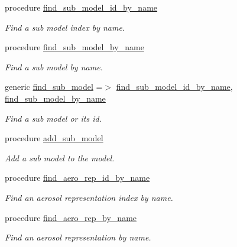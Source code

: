 \begin{DoxyCompactItemize}
procedure \mbox{\hyperlink{structpmc__phlex__core_1_1phlex__core__t_ae678b242f384c24e22677ac1265a2035}{find\+\_\+sub\+\_\+model\+\_\+id\+\_\+by\+\_\+name}}
\begin{DoxyCompactList}\small\item\em Find a sub model index by name. \end{DoxyCompactList}\item 
procedure \mbox{\hyperlink{structpmc__phlex__core_1_1phlex__core__t_aa741538e73789f6d392cc23c0e5e4ca3}{find\+\_\+sub\+\_\+model\+\_\+by\+\_\+name}}
\begin{DoxyCompactList}\small\item\em Find a sub model by name. \end{DoxyCompactList}\item 
generic \mbox{\hyperlink{structpmc__phlex__core_1_1phlex__core__t_aee9a9252bd18b2b2e0ce4f65ed8f7ec6}{find\+\_\+sub\+\_\+model}} =$>$ \mbox{\hyperlink{structpmc__phlex__core_1_1phlex__core__t_ae678b242f384c24e22677ac1265a2035}{find\+\_\+sub\+\_\+model\+\_\+id\+\_\+by\+\_\+name}}, \mbox{\hyperlink{structpmc__phlex__core_1_1phlex__core__t_aa741538e73789f6d392cc23c0e5e4ca3}{find\+\_\+sub\+\_\+model\+\_\+by\+\_\+name}}
\begin{DoxyCompactList}\small\item\em Find a sub model or it\textquotesingle{}s id. \end{DoxyCompactList}\item 
procedure \mbox{\hyperlink{structpmc__phlex__core_1_1phlex__core__t_afbf7ae9e7a1769c7ebff01280a190421}{add\+\_\+sub\+\_\+model}}
\begin{DoxyCompactList}\small\item\em Add a sub model to the model. \end{DoxyCompactList}\item 
procedure \mbox{\hyperlink{structpmc__phlex__core_1_1phlex__core__t_ab83bfd3d2af2f76074a52bb002080dd9}{find\+\_\+aero\+\_\+rep\+\_\+id\+\_\+by\+\_\+name}}
\begin{DoxyCompactList}\small\item\em Find an aerosol representation index by name. \end{DoxyCompactList}\item 
procedure \mbox{\hyperlink{structpmc__phlex__core_1_1phlex__core__t_a96eca5daa38236792c662465d0cdac99}{find\+\_\+aero\+\_\+rep\+\_\+by\+\_\+name}}
\begin{DoxyCompactList}\small\item\em Find an aerosol representation by name. \end{DoxyCompactList}\item 

\end{DoxyCompactItemize}
